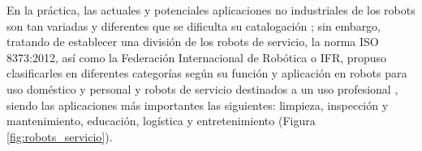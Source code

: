 
     

En la práctica, las actuales y potenciales aplicaciones no industriales de los robots son tan variadas y diferentes que se dificulta su catalogación \cite{Barrientos02}; sin embargo, tratando de establecer una división de los robots de servicio, la norma ISO 8373:2012, así como la Federación Internacional de Robótica o IFR, propuso clasificarles en diferentes categorías según su función y aplicación en robots para uso doméstico y personal y robots de servicio destinados a un uso profesional \cite{Gonzalez21}, siendo las aplicaciones más importantes las siguientes: limpieza, inspección y mantenimiento, educación, logística y entretenimiento (Figura \ref{fig:robots_servicio}).

